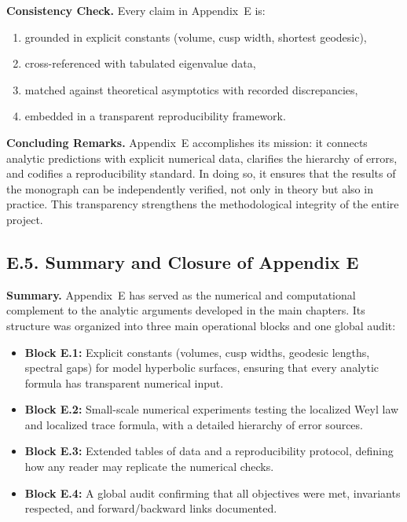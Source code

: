 \medskip
\noindent \textbf{Consistency Check.}
Every claim in Appendix~E is:
\begin{enumerate}
  \item grounded in explicit constants (volume, cusp width, shortest geodesic),  
  \item cross-referenced with tabulated eigenvalue data,  
  \item matched against theoretical asymptotics with recorded discrepancies,  
  \item embedded in a transparent reproducibility framework.  
\end{enumerate}

\medskip
\noindent \textbf{Concluding Remarks.}
Appendix~E accomplishes its mission: it connects analytic predictions with
explicit numerical data, clarifies the hierarchy of errors, and codifies a
reproducibility standard. In doing so, it ensures that the results of the
monograph can be independently verified, not only in theory but also in
practice. This transparency strengthens the methodological integrity of the
entire project.

\subsection*{E.5. Summary and Closure of Appendix E}

\noindent \textbf{Summary.}
Appendix~E has served as the numerical and computational complement to the
analytic arguments developed in the main chapters. Its structure was organized
into three main operational blocks and one global audit:
\begin{itemize}
  \item \textbf{Block E.1:} Explicit constants (volumes, cusp widths, geodesic
  lengths, spectral gaps) for model hyperbolic surfaces, ensuring that every
  analytic formula has transparent numerical input.  
  \item \textbf{Block E.2:} Small-scale numerical experiments testing the
  localized Weyl law and localized trace formula, with a detailed hierarchy of
  error sources.  
  \item \textbf{Block E.3:} Extended tables of data and a reproducibility
  protocol, defining how any reader may replicate the numerical checks.  
  \item \textbf{Block E.4:} A global audit confirming that all objectives were
  met, invariants respected, and forward/backward links documented.  
\end{itemize}

